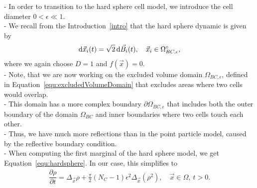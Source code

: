 - In order to transition to the hard sphere cell model, we introduce the cell diameter $0 < \epsilon \ll 1$. \\
- We recall from the Introduction~\ref{intro} that the hard sphere dynamic is given by
\begin{equation*}
    \mathrm{d} \vec{x}_i(t) = \sqrt{2} \, \mathrm{d} \vec{B}_i(t), \quad \vec{x}_i \in \Omega_{BC, \epsilon}^{\circ}, 
\end{equation*}
where we again choose $D = 1$ and $f(\vec{x}) = 0$.  \\
- Note, that we are now working on the excluded volume domain $\Omega_{BC, \epsilon}$, defined in Equation~\eqref{equ:excludedVolumeDomain} that excludes areas where two cells would overlap. \\ 
- This domain has a more complex boundary $\partial \Omega_{BC, \epsilon}$ that includes both the outer boundary of the domain $\Omega_{BC}$ and inner boundaries where two cells touch each other. \\  
- Thus, we have much more reflections than in the point particle model, caused by the reflective boundary condition. \\
- When computing the first marginal of the hard sphere model, we get Equation~\eqref{equ:hardsphere}.
In our case, this simplifies to
\begin{align}
	\dfrac{\partial \rho}{\partial t} = \Delta_{\vec{x}} \rho + \frac{\pi}{2} (N_C - 1) \epsilon^2 \Delta_{\vec{x}} (\rho^2), \quad \vec{x} \in \Omega, \: t>0 . 
    \label{equ:marginalHSCM}
\end{align}


